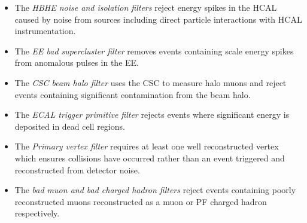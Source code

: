 \begin{itemize}
\item The \emph{HBHE noise and isolation filters} reject energy spikes in the HCAL caused by noise from sources 
including direct particle interactions with HCAL instrumentation.
\item The \emph{EE bad supercluster filter} removes events containing \TeV scale energy spikes from anomalous
pulses in the EE.
\item The \emph{CSC beam halo filter} uses the CSC to measure halo muons and reject events containing 
significant contamination from the beam halo.
\item The \emph{ECAL trigger primitive filter} rejects events where significant energy is deposited in dead cell regions.
\item The \emph{Primary vertex filter} requires at least one well reconstructed vertex which ensures collisions have occurred
rather than an event triggered and reconstructed from detector noise.
\item The \emph{bad muon and bad charged hadron filters} reject events containing poorly reconstructed muons reconstructed as 
a muon or PF charged hadron respectively.
\end{itemize}


